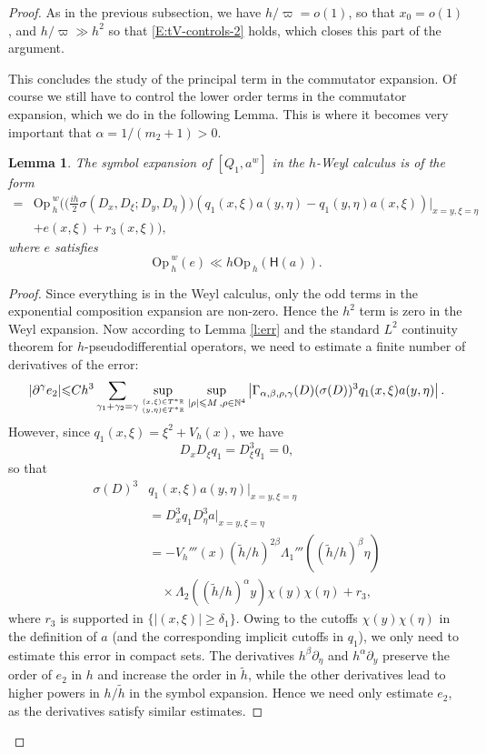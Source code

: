 \documentclass[twoside, final]{amsart}
\newtheorem{lemma}[proposition]{Lemma}
\theoremstyle{definition}
\numberwithin{equation}{section}
\begin{document}
\begin{proof}
As in the previous subsection, we have $h / \varpi = o(1)$, so that
$x_0 = o(1)$, and $h / \varpi \gg h^2$ so that \eqref{E:tV-controls-2} holds, which
closes this part of the argument.

This concludes the study of the principal term in the commutator
expansion.  Of course we still have to control the lower order terms
in the commutator expansion, which we do in the following Lemma.  This
is where it becomes very important that $\alpha = 1/(m_2 +1) >0$.

\begin{lemma}
\label{L:Q-comm-error-4a}
The symbol expansion of $[Q_1, a^w]$ in the $h$-Weyl calculus is of
the form
\begin{align*}
[Q_1, a^w] = & {\mathrm{Op}\,}_h^w \Bigg( \Big( 
\frac{i h}{2} \sigma ( D_x , D_\xi; D_y , D_\eta) \Big) (q_1(x, \xi)
a(y, \eta) - q_1(y, \eta) a ( x , \xi) ) |_{ x = y , \xi = \eta} \\
& + e (
x, \xi ) + r_3(x, \xi)\Bigg) ,
\end{align*}
where $e$ satisfies
\[
{\mathrm{Op}\,}_h^w(e)  
\ll h {\mathrm{Op}\,}_h({{\textsf{H}}} (a)).
\]

\end{lemma}

\begin{proof}
Since everything is in the Weyl calculus, only the odd terms in the
exponential composition expansion are non-zero.  Hence the $h^2$ term
is zero in the Weyl expansion.  
Now according to Lemma \ref{l:err} and the standard $L^2$ continuity
theorem for $h$-pseudodifferential operators, we need to estimate a
finite number of 
derivatives of the error:
\[
 | \partial^{\gamma} e_2 | {\leqslant} C h^{3}
\sum_{ \gamma_1 + \gamma_2 = \gamma } 
 \sup_{ 
{{( x, \xi) \in T^* {\mathbb{R}} }
\atop{ ( y , \eta) \in T^* {\mathbb{R}} }}} \sup_{
|\rho | {\leqslant} M  \,, \rho \in {{\mathbb N}}^{4} }
\left|
\Gamma_{\alpha, \beta, \rho, \gamma}(D)
( \sigma ( D) ) ^{3} q_1 ( x , \xi)  
a ( y, \eta ) 
\right|  
.
\]
However, since $q_1(x, \xi) = \xi^2 + V_h(x)$, we have
\[
D_x D_\xi q_1 = D_{\xi}^3 q_1 = 0,
\]
so that
\begin{align*}
\sigma(D)^3 & q_1(x, \xi) a(y, \eta) |_{ x = y , \xi = \eta} \\
& = D_x^3 q_1 D_\eta^3 a |_{ x = y , \xi = \eta} \\
& = -V_h'''(x) ({\tilde{h}}/h)^{2 \beta} \Lambda_1'''
(({\tilde{h}}/h)^{\beta} \eta) \\
& \quad \times \Lambda_2(({\tilde{h}}/h)^{\alpha} y) \chi(y)
\chi(\eta)
+ r_3,
\end{align*}
where $r_3$ is supported in $\{ | (x, \xi) | {\geqslant} \delta_1 \}$.  
Owing to the cutoffs $\chi(y) \chi(\eta)$ in the definition of $a$
(and the corresponding implicit cutoffs in $q_1$), we only need to
estimate this error in compact sets.  The derivatives
$h^{\beta} \partial_\eta$ and $h^\alpha \partial_y$
preserve the order of $e_2$ in $h$ and increase the order in ${\tilde{h}}$, while the other derivatives lead
to higher powers in $h/{\tilde{h}}$ in the symbol expansion.  Hence we need only estimate $e_2$,
as the derivatives satisfy similar estimates.


\end{proof}
\end{proof}
\end{document}
